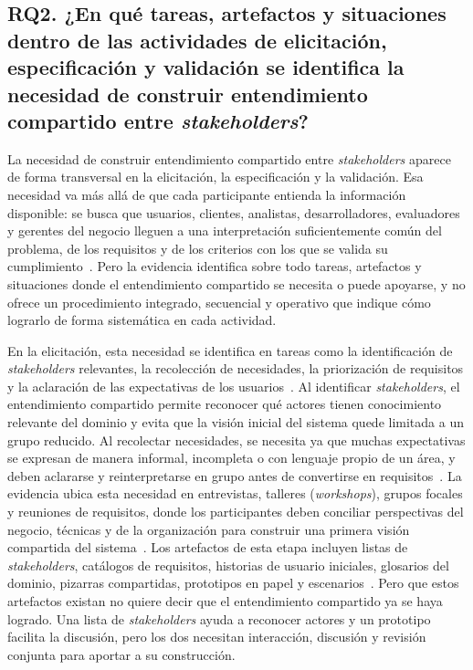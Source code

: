 \documentclass[12pt,letterpaper,oneside]{report}
\begin{document}
\subsection{RQ2. ¿En qué tareas, artefactos y situaciones dentro de las
actividades de elicitación, especificación y validación se identifica la
necesidad de construir entendimiento compartido entre \textit{stakeholders}?}
La necesidad de construir entendimiento compartido entre \textit{stakeholders}
aparece de forma transversal en la elicitación, la especificación y la
validación. Esa necesidad va más allá de que cada participante entienda la información
disponible: se busca que usuarios, clientes, analistas, desarrolladores,
evaluadores y gerentes del negocio lleguen a una interpretación suficientemente
común del problema, de los requisitos y de los criterios con los que se valida
su cumplimiento~\cite{balasubramaniam2023}.
Pero la evidencia identifica sobre todo tareas, artefactos y situaciones donde
el entendimiento compartido se necesita o puede apoyarse, y no ofrece un
procedimiento integrado, secuencial y operativo que indique cómo lograrlo de
forma sistemática en cada actividad.

En la elicitación, esta necesidad se identifica en tareas como la
identificación de \textit{stakeholders} relevantes, la recolección de
necesidades, la priorización de requisitos y la aclaración de las expectativas
de los usuarios~\cite{khan2022stakeholders}. Al identificar
\textit{stakeholders}, el entendimiento compartido permite reconocer qué
actores tienen conocimiento relevante del dominio y evita que la visión inicial
del sistema quede limitada a un grupo reducido. Al recolectar necesidades, se
necesita ya que muchas expectativas se expresan de manera informal, incompleta o
con lenguaje propio de un área, y deben aclararse y reinterpretarse en grupo
antes de convertirse en requisitos~\cite{laporte2023}. La evidencia ubica esta
necesidad en entrevistas, talleres (\textit{workshops}), grupos focales y
reuniones de requisitos, donde los participantes deben conciliar perspectivas
del negocio, técnicas y de la organización para construir una primera visión
compartida del sistema~\cite{calefato2015}. Los artefactos de esta etapa
incluyen listas de \textit{stakeholders}, catálogos de requisitos, historias de
usuario iniciales, glosarios del dominio, pizarras compartidas, prototipos en
papel y escenarios~\cite{martins2019}. Pero que estos artefactos existan no
quiere decir que el entendimiento compartido ya se haya logrado. Una lista de
\textit{stakeholders} ayuda a reconocer actores y un prototipo facilita la
discusión, pero los dos necesitan interacción, discusión y revisión conjunta
para aportar a su construcción.
\end{document}
